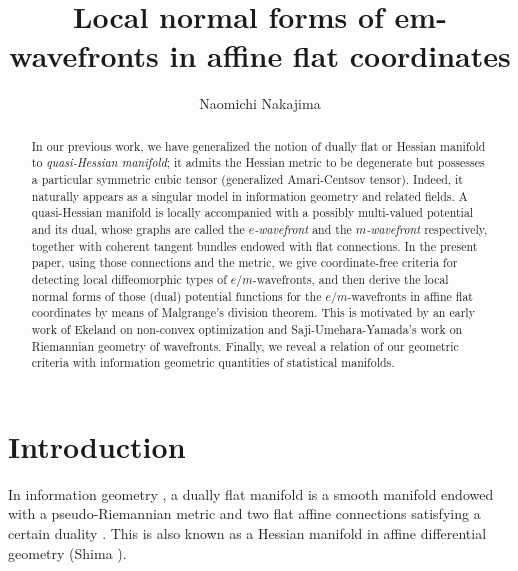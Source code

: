 \documentclass[10pt]{amsart}
\begin{document}
%
\title[Local normal forms of em-wavefronts in affine coordinates]
{Local normal forms of em-wavefronts in affine flat coordinates}
%
\author[N.~Nakajima]{Naomichi Nakajima}
\address[N.~Nakajima]{D2, Graduate School of Information Science and Technology, Hokkaido University,
Sapporo 060-0814, Japan}
%
%
%
% 
%
\dedicatory{}
%
\begin{abstract}
In our previous work, we have generalized the notion of dually flat or Hessian manifold to {\em quasi-Hessian manifold}; it admits the Hessian metric to be degenerate but possesses a particular symmetric cubic tensor (generalized Amari-Centsov tensor).  
Indeed, it naturally appears as a singular model in information geometry and related fields. 
A quasi-Hessian manifold is locally accompanied with a possibly multi-valued potential and its dual, whose graphs are called the {\em $e$-wavefront} and the {\em $m$-wavefront} respectively, together with coherent tangent bundles endowed with flat connections.
In the present paper, using those connections and the metric, we give coordinate-free criteria for detecting local diffeomorphic types of $e/m$-wavefronts, and then derive the local normal forms of those (dual) potential functions for the $e/m$-wavefronts in affine flat coordinates by means of Malgrange's division theorem.  
This is motivated by an early work of Ekeland on non-convex optimization and Saji-Umehara-Yamada's work on Riemannian geometry of wavefronts. 
Finally, we reveal a relation of our geometric criteria with information geometric quantities of statistical manifolds. 
\end{abstract}


\maketitle

\section{Introduction}\label{sec1:intro}
In information geometry \cite{AmariNagaoka00}, a dually flat manifold is a smooth manifold endowed with a pseudo-Riemannian metric and two flat affine connections satisfying a certain duality \cite{AmariNagaoka00, Amari16}.
This is also known as a Hessian manifold in affine differential geometry (Shima \cite{Shima}).
\end{document}

